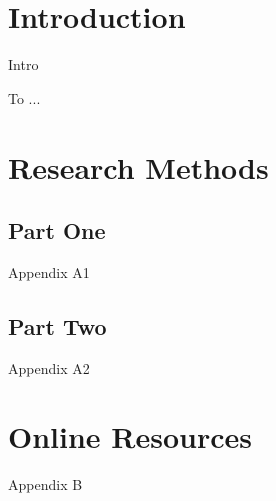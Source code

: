 \documentclass[sigconf,usenames,dvipsnames,svgnames,table]{acmart}
\begin{document}


\maketitle

\section{Introduction}
\sysname Intro
\cite{gem5_sim}
\cite{Spec_TT}


\begin{acks}
To ...
\end{acks}




\appendix

\section{Research Methods}

\subsection{Part One}

Appendix A1

\subsection{Part Two}

Appendix A2

\section{Online Resources}

Appendix B
\end{document}

